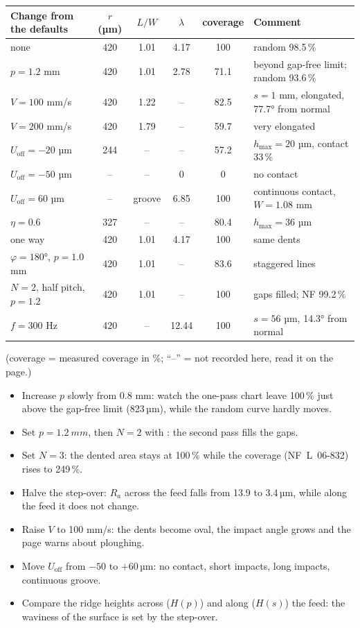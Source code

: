 \documentclass[11pt,a4paper]{article}
\begin{document}
\begin{center}
\small
\begin{tabular}{@{}lccccl@{}}
\toprule
Change from the defaults & $r$ (µm) & $L/W$ & $\lambda$ & coverage & Comment\\ \midrule
none & 420 & 1.01 & 4.17 & 100 & random 98.5\,\%\\
$p=1.2$ mm & 420 & 1.01 & 2.78 & 71.1 & beyond gap-free limit; random 93.6\,\%\\
$V=100$ mm/s & 420 & 1.22 & -- & 82.5 & $s=1$ mm, elongated, 77.7° from normal\\
$V=200$ mm/s & 420 & 1.79 & -- & 59.7 & very elongated\\
$U_\mathrm{off}=-20$ µm & 244 & -- & -- & 57.2 & $h_\mathrm{max}=20$ µm, contact 33\,\%\\
$U_\mathrm{off}=-50$ µm & -- & -- & 0 & 0 & no contact\\
$U_\mathrm{off}=60$ µm & -- & groove & 6.85 & 100 & continuous contact, $W=1.08$ mm\\
$\eta=0.6$ & 327 & -- & -- & 80.4 & $h_\mathrm{max}=36$ µm\\
one way & 420 & 1.01 & 4.17 & 100 & same dents\\
$\varphi=180°$, $p=1.0$ mm & 420 & 1.01 & -- & 83.6 & staggered lines\\
$N=2$, half pitch, $p=1.2$ & 420 & 1.01 & -- & 100 & gaps filled; NF 99.2\,\%\\
$f=300$ Hz & 420 & -- & 12.44 & 100 & $s=56$ µm, 14.3° from normal\\ \bottomrule
\end{tabular}
\end{center}
\noindent(coverage = measured coverage in \%; ``--'' = not recorded here, read it on the page.)

\begin{trybox}
\begin{itemize}[nosep,leftmargin=*]
\item Increase $p$ slowly from 0.8 mm: watch the one-pass chart leave 100\,\% just above the gap-free limit (823\,µm), while the random curve hardly moves.
\item Set $p=\SI{1.2}{mm}$, then $N=2$ with : the second pass fills the gaps.
\item Set $N=3$: the dented area stays at 100\,\% while the coverage (NF~L~06-832) rises to 249\,\%.
\item Halve the step-over: $R_a$ across the feed falls from 13.9 to 3.4\,µm, while along the feed it does not change.
\item Raise $V$ to 100 mm/s: the dents become oval, the impact angle grows and the page warns about ploughing.
\item Move $U_\mathrm{off}$ from $-50$ to $+60$\,µm: no contact, short impacts, long impacts, continuous groove.
\item Compare the ridge heights across ($H(p)$) and along ($H(s)$) the feed: the waviness of the surface is set by the step-over.
\end{itemize}
\end{trybox}
\end{document}

